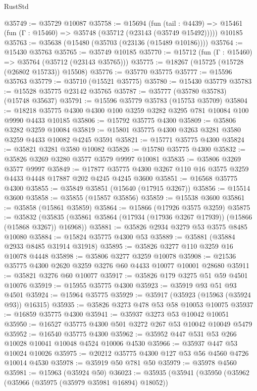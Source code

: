 \begin{lexlean}{RustStd}
\begin{coremodule}
{\begin{coremodule}
{{{{{{{{{{{{{{{{{{{{{{{{{{{{{{{{{{{{{{{{{{{{{{{{{{{{{{{{{{{{@35749 := @35729 @10087
@35758 := @15694
    (fun (tail : @4439) => @15461 (fun (Γ : @15460) => @35748 (@35712 (@23143 (@35749 @15492)))))
    @10185
@35763 := @35638 (@15480 (@35703 (@23136 (@15489 @10186))))
@35764 := @15430 @35763
@35765 := @35749 @10185
@35770 := @15712 (fun (Γ : @15460) => @35764 (@35712 (@23143 @35765)))
@35775 := @18267 (@15725 (@15728 (@26802 @15733)) @15508)
@35776 := @35770 @35775
@35777 := @15596 @35763
@35779 := @35710 (@15521 @35775)
@35780 := @15430 @35779
@35783 := @15528 @35775 @23142 @35765
@35787 := @35777 (@35780 @35783) (@15748 @35637)
@35791 := @15596 @35779 @35783 (@15753 @35709)
@35804 := @18218 @35775 @4300 @4300 @100 @3259 @3282 @3295 @781 @10084 @100 @9990 @4433 @10185
@35806 := @15792 @35775 @4300
@35809 := @35806 @3282 @3259 @10084
@35819 := @15801 @35775 @4300 @3263 @3281 @3580 @3259 @4433 @10082 @4245 @3591
@35821 := @15771 @35775 @4300
@35824 := @35821 @3281 @3580 @10082
@35826 := @15780 @35775 @4300
@35832 := @35826 @3269 @3280 @3577 @3579 @9997 @10081
@35835 := @35806 @3269 @3577 @9997
@35849 := @17877 @35775 @4300 @3267 @110 @16 @3575 @3259 @4433 @4448 @17887 @202 @4245 @4245 @3600
@35851 := @16568 @35775 @4300
@35855 := @35849 @35851 (@15640 (@17915 @3267))
@35856 := @15514 @3600
@35858 := @35855 (@15857 @35856)
@35859 := @15538 @3600
@35861 := @35858 (@15861 @35859)
@35864 := @15866 (@17926 @3575 @3259)
@35875 := @35832
    (@35835 (@35861 @35864 (@17934 (@17936 @3267 @17939)) (@15866 (@15868 @3267)) @16968))
@35881 := @35826 @2934 @3279 @53 @3575 @8485 @10080
@35884 := @15824 @35775 @4300 @53
@35889 := @35881 (@35884 @2933 @8485 @31914 @31918)
@35895 := @35826 @3277 @110 @3259 @16 @10078 @4448
@35898 := @35806 @3277 @3259 @10078
@35908 := @21536 @35775 @4300 @2620 @3259 @3276 @60 @4433 @10077 @10001 @28680
@35911 := @35821 @3276 @60 @10077
@35917 := @35826 @179 @3275 @51 @59 @4501 @10076
@35919 := @15955 @35775 @4300
@35923 := @35919 @93 @51 @93 @4501
@35924 := @15964 @35775
@35929 := @35917 (@35923 (@15963 (@35924 @93)) @16315)
@35935 := @35826 @3273 @478 @53 @58 @10053 @10075
@35937 := @16859 @35775 @4300
@35941 := @35937 @3273 @53 @10042 @10051
@35950 := @16527 @35775 @4300 @501 @3272 @267 @53 @10042 @10049 @5479
@35952 := @16540 @35775 @4300
@35962 := @35952 @447 @531 @53 @266 @10028 @10041 @10048 @4524 @10006 @4530
@35966 := @35937 @447 @53 @10024 @10026
@35975 := @20212 @35775 @4300 @127 @53 @56 @4560 @4726 @10014 @4530
@35978 := @35919 @50 @781 @50
@35979 := @35978 @4560
@35981 := @15963 (@35924 @50)
@36023 := @35935
    (@35941
      (@35950
        (@35962
          (@35966 (@35975 (@35979 @35981 @16894) @18052))
}}}}}}}}}}}}}}}}}}}}}}}}}}}}}}}}}}}}}}}}}}}}}}}}}}}}}}}}}}}}
\end{coremodule}}
\end{coremodule}
\end{lexlean}
